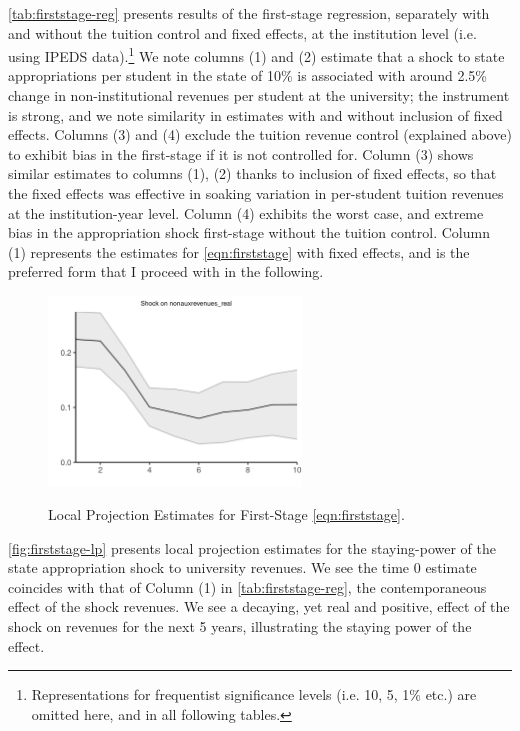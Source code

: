 \documentclass[notitlepage,12pt]{article}
\begin{document}
\autoref{tab:firststage-reg} presents results of the first-stage regression, separately with and without the tuition control and fixed effects, at the institution level (i.e. using IPEDS data).\footnote{
    Representations for frequentist significance levels (i.e. 10, 5, 1\% etc.) are omitted here, and in all following tables.
}
We note columns (1) and (2) estimate that a shock to state appropriations per student in the state of 10\% is associated with around 2.5\% change in non-institutional revenues per student at the university; the instrument is strong, and we note similarity in estimates with and without inclusion of fixed effects.
Columns (3) and (4) exclude the tuition revenue control (explained above) to exhibit bias in the first-stage if it is not controlled for.
Column (3) shows similar estimates to columns (1), (2) thanks to inclusion of fixed effects, so that the fixed effects was effective in soaking variation in per-student tuition revenues at the institution-year level.
Column (4) exhibits the worst case, and extreme bias in the appropriation shock first-stage without the tuition control.
Column (1) represents the estimates for \autoref{eqn:firststage} with fixed effects, and is the preferred form that I proceed with in the following.

\begin{figure}[h!]
    \centering
    \caption{Local Projection Estimates for First-Stage \autoref{eqn:firststage}.}
    \includegraphics[width=0.6\textwidth]{figures/firststage-lp.png}
    \label{fig:firststage-lp}
\end{figure}

\autoref{fig:firststage-lp} presents local projection estimates for the staying-power of the state appropriation shock to university revenues.
We see the time 0 estimate coincides with that of Column (1) in \autoref{tab:firststage-reg}, the contemporaneous effect of the shock revenues.
We see a decaying, yet real and positive, effect of the shock on revenues for the next 5 years, illustrating the staying power of the effect.
\end{document}
